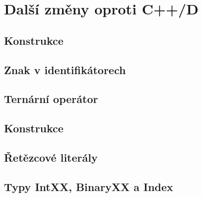 \section{Další změny oproti C++/D}

\subsection{Konstrukce }

\subsection{Znak \inlineCode{\#} v identifikátorech}

\subsection{Ternární operátor} \label{ternary}

\subsection{Konstrukce }

\subsection{Řetězcové literály}

\subsection{Typy IntXX, BinaryXX a Index}